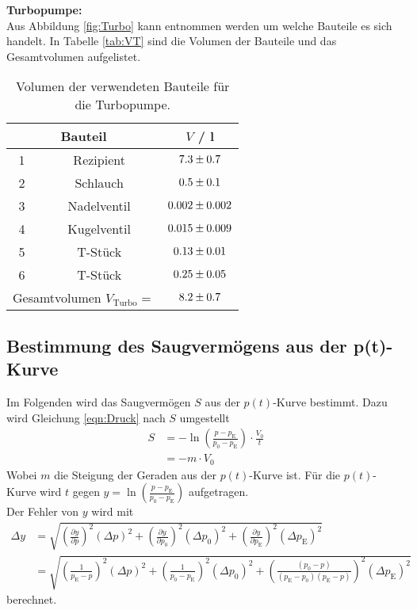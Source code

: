 \textbf{Turbopumpe:} \\
Aus Abbildung \eqref{fig:Turbo} kann entnommen werden um welche Bauteile es sich handelt. In Tabelle \eqref{tab:VT} sind die Volumen der Bauteile und das Gesamtvolumen aufgelistet.

\begin{table}[H] %
  \centering
  \caption{Volumen der verwendeten Bauteile für die Turbopumpe.}
  \label{tab:VT}
  \begin{tabular}{c|c|c}
    \multicolumn{2}{c|}{Bauteil} & $V$ / l \\
    \midrule
    1 & Rezipient & $\num{7.3 +- 0.7}$ \\
    2 & Schlauch & $\num{0.5 +- 0.1}$ \\
    3 & Nadelventil & $\num{0.002 +- 0.002}$ \\
    4 & Kugelventil & $\num{0.015 +- 0.009}$ \\
    5 & T-Stück & $\num{0.13 +- 0.01}$ \\
    6 & T-Stück & $\num{0.25 +- 0.05}$ \\
    \midrule
    \multicolumn{2}{c}{Gesamtvolumen $V_\text{Turbo} =$} & $\num{8.2 +- 0.7}$ \\
  \end{tabular}
\end{table}



\subsection{Bestimmung des Saugvermögens aus der p(t)-Kurve}
Im Folgenden wird das Saugvermögen $S$ aus der $p(t)$-Kurve bestimmt. Dazu wird Gleichung \eqref{eqn:Druck} nach $S$ umgestellt
\begin{align}
  S &= -\ln\left(\frac{p - p_\text{E}}{p_0 - p_\text{E}} \right) \cdot \frac{V_0}{t} \\
  &= -m\cdot V_0
\end{align}
Wobei $m$ die Steigung der Geraden aus der $p(t)$-Kurve ist. Für die $p(t)$-Kurve wird $t$ gegen $y = \ln\left(\frac{p - p_\text{E}}{p_0 - p_\text{E}} \right)$ aufgetragen. \\
Der Fehler von $y$ wird mit
\begin{align}
  \Delta y &= \sqrt{ \left(\frac{\partial y}{\partial p} \right)^2 (\Delta p)^2 + \left(\frac{\partial y}{\partial p_0} \right)^2 (\Delta p_0)^2 + \left(\frac{\partial y}{\partial p_\text{E}} \right)^2 (\Delta p_\text{E})^2 } \nonumber \\
  &= \sqrt{ \left(\frac{1}{p_\text{E}-p} \right)^2 (\Delta p)^2 + \left(\frac{1}{p_0-p_\text{E}} \right)^2 (\Delta p_0)^2 + \left(\frac{(p_0-p)}{(p_\text{E}-p_0)(p_\text{E}-p)} \right)^2 (\Delta p_\text{E})^2 }
\end{align}
berechnet.



